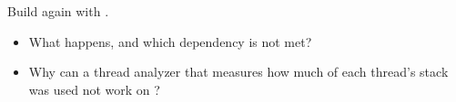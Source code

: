 \label{c3:ex:5.2}

Build  again with .

\begin{itemize}
  \item What happens, and which dependency is not met?
  \item Why can a thread analyzer that measures how much of each thread’s stack was used not work on
    ?
\end{itemize}
